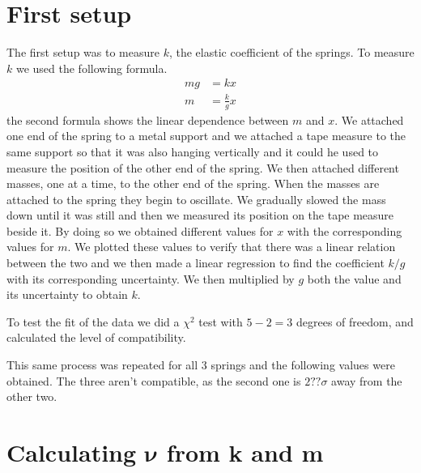 \documentclass{article}
\begin{document}
\section{First setup} \label{sec:setup1}
The first setup was to measure $k$, the elastic coefficient of the springs. 
To measure $k$ we used the following formula.
\begin{align}
    mg &= kx \\
    m  &= \frac{k}{g}x
\end{align}
the second formula shows the linear dependence between $m$ and $x$.
We attached one end of the spring to a metal support and we attached a
tape measure to the same support so that it was also hanging
vertically and it could he used to measure the position of the other
end of the spring. We then attached different masses, one at a time, to the other 
end of the spring. When the masses are attached to the spring they
begin to oscillate. We gradually slowed the mass down until it was
still and then we measured its position on the tape measure beside
it. By doing so we obtained different values for $x$ with the
corresponding values for $m$. We plotted these values to verify that
there was a linear relation between the two and we then made a linear
regression to find the coefficient $k/g$ with its corresponding
uncertainty. We then multiplied by $g$ both the value and its uncertainty to obtain $k$. 

To test the fit of the data we did a $\chi^2$ test with $5-2 = 3$ degrees of freedom, and calculated the level of compatibility.

This same process was repeated for all 3 springs and the following values were obtained.
The three aren't compatible, as the second one is $2?? \sigma$ away from the other two. 

\section{Calculating $\bm \nu$ from k and m} \label{sec:nukm}
\end{document}
